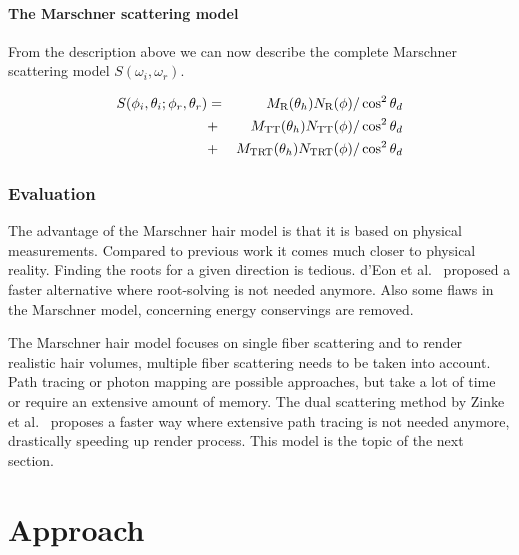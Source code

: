 \documentclass[11pt,a4paper]{report}
\begin{document}
\subsubsection{The Marschner scattering model}

From the description above we can now describe the complete Marschner scattering model $S(\omega_i, \omega_r)$.

\begin{eqnarray*}
S(\phi_i,\theta_i; \phi_r, \theta_r) & = & M_\textnormal{R}(\theta_h) N_\textnormal{R}(\phi) / \cos^2 \theta_d \\
& + & M_{\textnormal{TT}}(\theta_h) N_{\textnormal{TT}}(\phi) / \cos^2 \theta_d \\
& + & M_{\textnormal{TRT}}(\theta_h) N_{\textnormal{TRT}}(\phi) / \cos^2 \theta_d \\
\label{eq_marschner}
\end{eqnarray*}

\subsection{Evaluation}

The advantage of the Marschner hair model is that it is based on physical measurements. Compared to previous work it comes much closer to physical reality. Finding the roots for a given direction is tedious. d'Eon et al.~\cite{eon2011} proposed a faster alternative where root-solving is not needed anymore. Also some flaws in the Marschner model, concerning energy conservings are removed.

The Marschner hair model focuses on single fiber scattering and to render realistic hair volumes, multiple fiber scattering needs to be taken into account. Path tracing or photon mapping are possible approaches, but take a lot of time or require an extensive amount of memory. The dual scattering method by Zinke et al.~\cite{zinke} proposes a faster way where extensive path tracing is not needed anymore, drastically speeding up render process. This model is the topic of the next section. 

%
%




\chapter{Approach}
\end{document}
